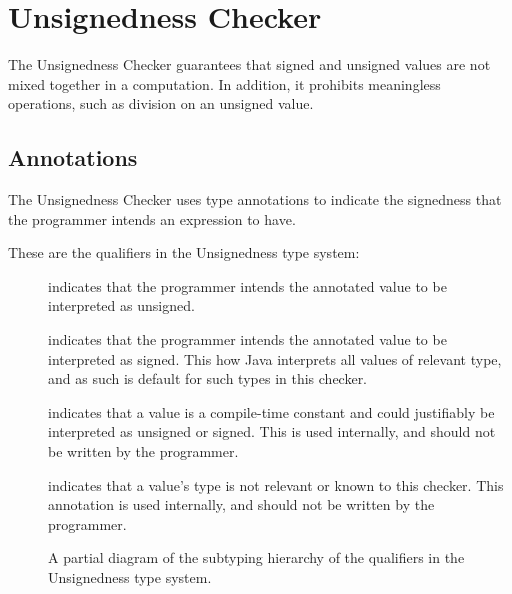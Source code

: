\htmlhr
\chapter{Unsignedness Checker\label{unsignedness-checker}}

The Unsignedness Checker guarantees that signed and unsigned values are not mixed 
together in a computation. In addition, it prohibits meaningless operations, such 
as division on an unsigned value.

\section{Annotations\label{unsignedness-checker-annotations}}

The Unsignedness Checker uses type annotations to indicate the signedness that the programmer intends an expression to have.

These are the qualifiers in the Unsignedness type system:

\begin{description}

\item[]
    indicates that the programmer intends the annotated value to be interpreted as unsigned.

\item[]
    indicates that the programmer intends the annotated value to be interpreted as signed. This how Java interprets all values of relevant type, and as such is default for such types in this checker.

\item[]
    indicates that a value is a compile-time constant and could justifiably be interpreted as unsigned or signed. This is used internally, and should not be written by the programmer.

\item[]
    indicates that a value’s type is not relevant or known to this checker. This annotation is used internally, and should not be
    written by the programmer.

\end{description}

\begin{figure}
\caption{A partial diagram of the subtyping hierarchy of the qualifiers in the 
Unsignedness type system.}
\label{fig-unsignedness-hierarchy}
\end{figure}

